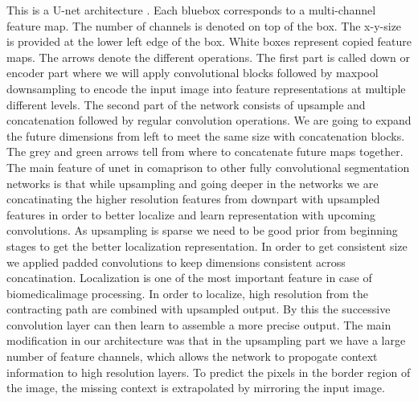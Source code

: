 This is a U-net architecture . Each bluebox corresponds to a multi-channel feature map. The number of channels is denoted on top of the box. The x-y-size is provided at the lower left edge of the box. White boxes represent copied feature maps. The arrows denote the different operations.\newline
The first part is called down or encoder part where we will apply convolutional blocks followed by maxpool downsampling to encode the input image into feature representations at multiple different levels. The second part of the network consists of upsample and concatenation followed by regular convolution operations. We are going to expand the future dimensions from left to meet the same size  with concatenation blocks. The grey and green arrows tell from where to concatenate future maps together. The main feature of unet in comaprison to other fully convolutional segmentation networks is that while upsampling and going deeper in the networks we are concatinating the higher resolution features from downpart with upsampled features in order to better localize and learn representation with upcoming convolutions. As upsampling is sparse we need to be good prior from beginning stages to get the better localization representation. In order to get consistent size we applied padded convolutions to keep dimensions consistent across concatination. Localization is one of the most important feature in case of biomedicalimage processing. In order to localize, high resolution from the contracting path are combined with upsampled output. By this the successive convolution layer can then learn to assemble a more precise output. The main modification in our architecture was that in the upsampling part we have a large number of feature channels, which allows the network to propogate context information to high resolution layers. To predict the pixels in the border region of the image, the missing context is extrapolated by mirroring the input image.
